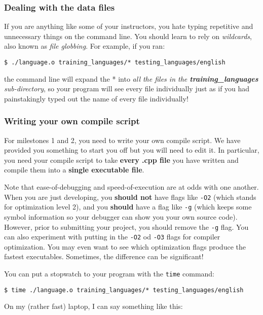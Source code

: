 \documentclass[]{article}
\begin{document}
\subsubsection{Dealing with the data
files}\label{dealing-with-the-data-files}

If you are anything like some of your instructors, you hate typing
repetitive and unnecessary things on the command line. You should learn
to rely on \emph{wildcards}, also known as \emph{file globbing}. For
example, if you ran:

\texttt{\$ ./language.o training_languages/* testing_languages/english}

the command line will expand the * into \emph{all the files in the
\textbf{training\_languages} sub-directory}, so your program will see
every file individually just as if you had painstakingly typed out the
name of every file individually!

\subsubsection{Writing your own compile
script}\label{writing-your-own-compile-script}

For milestones 1 and 2, you need to write your own compile script. We
have provided you something to start you off but you will need to edit
it. In particular, you need your compile script to take \textbf{every
.cpp file} you have written and compile them into a \textbf{single
executable file}.

Note that ease-of-debugging and speed-of-execution are at odds with one
another. When you are just developing, you \textbf{should not} have
flags like \texttt{-O2} (which stands for optimization level 2), and you
\textbf{should} have a flag like \texttt{-g} (which keeps some symbol
information so your debugger can show you your own source code).
However, prior to submitting your project, you should remove the
\texttt{-g} flag. You can also experiment with putting in the
\texttt{-O2} od \texttt{-O3} flags for compiler optimization. You may
even want to see which optimization flags produce the fastest
executables. Sometimes, the difference can be significant!

You can put a stopwatch to your program with the \texttt{time} command:

\texttt{\$ time ./language.o training_languages/* testing_languages/english}

On my (rather fast) laptop, I can say something like this:
\end{document}
